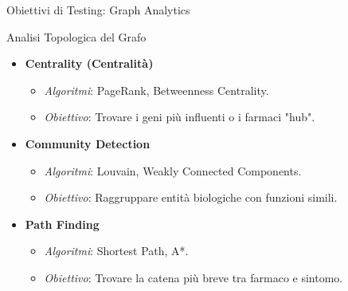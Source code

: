 \documentclass[aspectratio=169]{beamer}
\begin{document}
\begin{frame}{Obiettivi di Testing: Graph Analytics}
    \begin{block}{\faChartBar \hspace{0.2cm} Analisi Topologica del Grafo}
        \small
        \begin{itemize}
            \item[\faBullseye] \textbf{Centrality (Centralità)}
            \begin{itemize}
                \scriptsize \item \textit{Algoritmi}: PageRank, Betweenness Centrality.
                \scriptsize \item \textit{Obiettivo}: Trovare i geni più influenti o i farmaci "hub".
            \end{itemize}
            
            \item[\faNetworkWired] \textbf{Community Detection}
            \begin{itemize}
                \scriptsize \item \textit{Algoritmi}: Louvain, Weakly Connected Components.
                \scriptsize \item \textit{Obiettivo}: Raggruppare entità biologiche con funzioni simili.
            \end{itemize}
            
            \item[\faRoute] \textbf{Path Finding}
            \begin{itemize}
                \scriptsize \item \textit{Algoritmi}: Shortest Path, A*.
                \scriptsize \item \textit{Obiettivo}: Trovare la catena più breve tra farmaco e sintomo.
            \end{itemize}
        \end{itemize}
    \end{block}
\end{frame}
\end{document}
